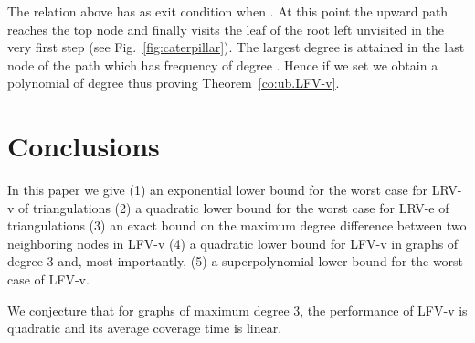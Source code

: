 The relation above has as exit condition when . At this point the upward path reaches the top node and finally visits the leaf of the root
left unvisited in the very first step (see Fig.~\ref{fig:caterpillar}). The largest degree is attained in the last node of the path which has frequency of degree .
Hence if we set  we obtain a polynomial of degree 
thus proving Theorem~\ref{co:ub.LFV-v}.

\section{Conclusions}
In this paper we give (1) an exponential lower bound for the
worst case for LRV-v of triangulations (2) a quadratic lower bound for
the worst case for LRV-e of triangulations (3) an exact bound on the maximum degree
difference between two neighboring nodes in LFV-v (4) a quadratic lower bound for LFV-v
in graphs of degree 3 and, most importantly, (5) a superpolynomial lower bound for the
worst-case of LFV-v.

We conjecture that for graphs of maximum degree 3, the performance of LFV-v is quadratic
and its average coverage time is linear.









